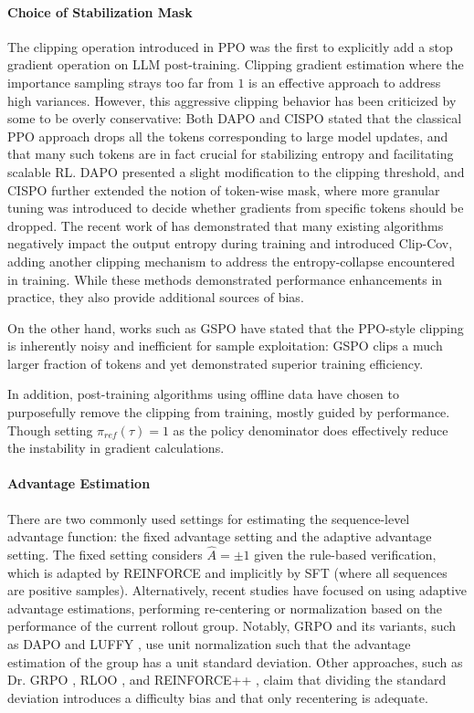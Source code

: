 \paragraph{Choice of Stabilization Mask}
The clipping operation introduced in PPO was the first to explicitly add a stop gradient operation on LLM post-training. Clipping gradient estimation where the importance sampling strays too far from $1$ is an effective approach to address high variances. However, this aggressive clipping behavior has been criticized by some to be overly conservative: Both DAPO \citep{yu2025dapo} and CISPO \citep{chen2025minimax} stated that the classical PPO approach drops all the tokens corresponding to large model updates, and that many such tokens are in fact crucial for stabilizing entropy and facilitating scalable RL. DAPO presented a slight modification to the clipping threshold, and CISPO further extended the notion of token-wise mask, where more granular tuning was introduced to decide whether gradients from specific tokens should be dropped. The recent work of \citet{cui2025entropy} has demonstrated that many existing algorithms negatively impact the output entropy during training and introduced Clip-Cov, adding another clipping mechanism to address the entropy-collapse encountered in training. While these methods demonstrated performance enhancements in practice, they also provide additional sources of bias.

On the other hand, works such as GSPO \citep{zheng2025group} have stated that the PPO-style clipping is inherently noisy and inefficient for sample exploitation: GSPO clips a much larger fraction of tokens and yet demonstrated superior training efficiency.

In addition, post-training algorithms using offline data have chosen to purposefully remove the clipping from training, mostly guided by performance. Though setting $\pi_{ref} (\tau ) = 1$ as the policy denominator does effectively reduce the instability in gradient calculations.

\paragraph{Advantage Estimation}
There are two commonly used settings for estimating the sequence-level advantage function: the fixed advantage setting and the adaptive advantage setting. The fixed setting considers $\hat{A} = \pm 1$ given the rule-based verification, which is adapted by REINFORCE and implicitly by SFT (where all sequences are positive samples). Alternatively, recent studies have focused on using adaptive advantage estimations, performing re-centering or normalization based on the performance of the current rollout group. Notably, GRPO and its variants, such as DAPO \citep{yu2025dapo} and LUFFY \citep{yan2025learning}, use unit normalization such that the advantage estimation of the group has a unit standard deviation. Other approaches, such as Dr. GRPO \citep{liu2025understanding}, RLOO \citep{ahmadian2024back}, and REINFORCE++ \citep{hu2025reinforce++}, claim that dividing the standard deviation introduces a difficulty bias and that only recentering is adequate. 

